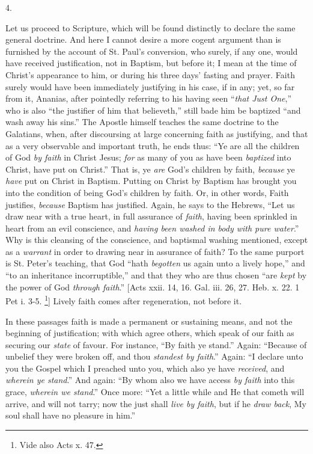 4.

Let us proceed to Scripture, which will be found distinctly to
declare the same general doctrine. And here I cannot desire a more
cogent argument than is furnished by the account of St. Paul's
conversion, who surely, if any one, would have received justification,
not in Baptism, but before it; I mean at the time of Christ's
appearance to him, or during his three days' fasting and prayer. Faith
surely would have been immediately justifying in his case, if in any;
yet, so far from it, Ananias, after pointedly referring to his having
seen ``\emph{that Just One},'' who is also ``the justifier
of him that believeth,'' still bade him be baptized ``and wash
away his sins.'' The Apostle himself teaches the same
doctrine to the Galatians, when, after discoursing at large concerning
faith as justifying, and that as a very observable and important
truth, he ends thus: ``Ye are all the children of God \emph{by faith} in
Christ Jesus; \emph{for} as many of you as have been \emph{baptized}
into Christ, have put on Christ.'' That is, ye \emph{are} God's
children by faith, \emph{because} ye \emph{have} put on Christ in
Baptism. Putting on Christ by Baptism has brought you into the
condition of being God's children by faith. Or, in other words, Faith
justifies, \emph{because} Baptism has justified. Again, he says to the
Hebrews, ``Let us draw near with a true heart, in full assurance
of \emph{faith}, having been sprinkled in heart from an evil
conscience, and \emph{having been washed in body with pure water}.''
Why is this cleansing of the conscience, and baptismal washing
mentioned, except as a \emph{warrant} in order to drawing near in
assurance of faith? To the same purport is St. Peter's teaching, that
God ``hath \emph{begotten} us again unto a lively hope,'' and
``to an inheritance incorruptible,'' and that they who are
thus chosen ``are \emph{kept} by the power of God \emph{through faith}.''
[Acts xxii. 14, 16. Gal. iii. 26, 27. Heb. x. 22. 1 Pet i. 3-5. \footnote{Vide also Acts
x. 47.}] Lively faith comes after regeneration, not before it.

In these passages faith is made a permanent or sustaining means,
and not the beginning of justification; with which agree others, which
speak of our faith as securing our \emph{state} of favour. For
instance, ``By faith ye stand.'' Again: ``Because of
unbelief they were broken off, and thou \emph{standest by faith}.''
Again: ``I declare unto you the Gospel which I preached unto you,
which also ye have \emph{received}, and \emph{wherein ye stand}.''
And again: ``By whom also we have access \emph{by faith} into this
grace, \emph{wherein we stand}.'' Once more: ``Yet a little
while and He that cometh will arrive, and will not tarry; now the just
shall \emph{live by faith}, but if he \emph{draw back}, My soul shall
have no pleasure in him.''


